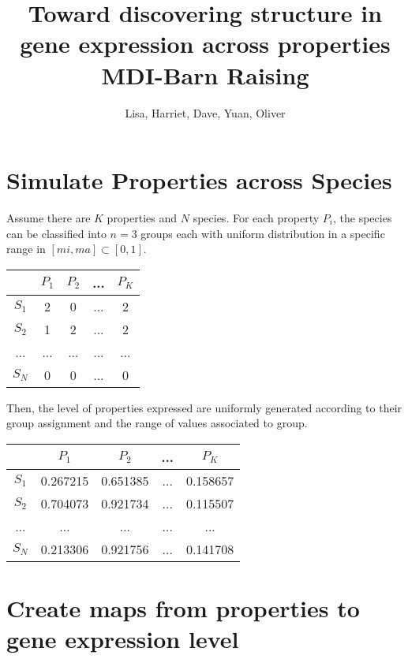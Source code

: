 \documentclass[11pt]{article}
\theoremstyle{plain}
\theoremstyle{definition}
\begin{document}
\title{Toward discovering structure in gene expression across properties\\
\small MDI-Barn Raising}
\author{Lisa, Harriet, Dave, Yuan, Oliver}
\maketitle

\section{Simulate Properties across Species}
Assume there are $K$ properties and $N$ species. For each property $P_i$, the species can be classified into $n=3$ groups each with uniform distribution in a specific range in $[mi, ma] \subset [0, 1]$.

\begin{center}
\begin{tabular}{ |c|c|c|c|c| }
\hline
  & $P_1$ & $P_2$ & ... & $P_K$ \\
\hline
$S_1$ & 2 & 0 & ... & 2 \\
\hline
$S_2$ & 1 & 2 & ... & 2 \\
\hline
... & ... & ... & ... & ... \\
\hline
$S_N$ & 0 & 0 & ... & 0 \\
\hline
\end{tabular}
\end{center}

Then, the level of properties expressed are uniformly generated according to their group assignment and the range of values associated to group.

\begin{center}
\begin{tabular}{ |c|c|c|c|c| }
\hline
  & $P_1$ & $P_2$ & ... & $P_K$ \\
\hline
$S_1$ & 0.267215  & 0.651385 & ... & 0.158657 \\
\hline
$S_2$ & 0.704073  & 0.921734 & ... & 0.115507 \\
\hline
... & ... & ... & ... & ... \\
\hline
$S_N$ & 0.213306  & 0.921756 & ... & 0.141708 \\
\hline
\end{tabular}
\end{center}

\section{Create maps from properties to gene expression level}
\end{document}
